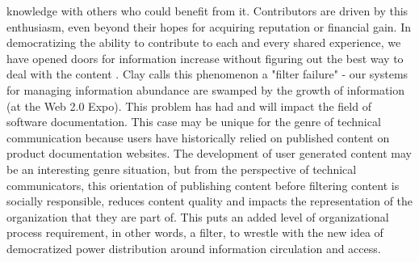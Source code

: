 knowledge with others who could benefit from it. Contributors are driven by this enthusiasm, even beyond their hopes for acquiring reputation or financial gain. In democratizing the ability to contribute to each and every shared experience, we have opened doors for information increase without figuring out the best way to deal with the content \cite{coleman2008hacker, blair2010too}. Clay \textcite{shirky2008here} calls this phenomenon a "filter failure" - our systems for managing information abundance are swamped by the growth of information (at the Web 2.0 Expo). This problem has had and will impact the field of software documentation. This case may be unique for the genre of technical communication because users have historically relied on published content on product documentation websites. The development of user generated content may be an interesting genre situation, but from the perspective of technical communicators, this orientation of publishing content before filtering content is socially responsible, reduces content quality and impacts the representation of the organization that they are part of. This puts an added level of organizational process requirement, in other words, a filter, to wrestle with the new idea of democratized power distribution around information circulation and access.

